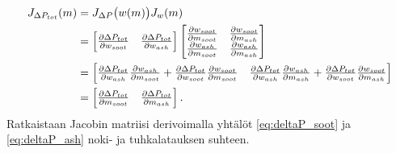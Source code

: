 \begin{align}\label{eq:jacob_total_general}
    \begin{split}
        J_{\Delta P_{tot}}(m)&=
        J_{\Delta P}\big(w(m)\big)  J_{w}(m)
\\ &=
    \begin{bmatrix}   
        \frac{\partial \Delta P_{tot}}{\partial w_{soot}}
        &   
        \frac{\partial \Delta P_{tot}}{\partial w_{ash}}
         \end{bmatrix}
    \begin{bmatrix} 
        \frac{\partial w_{soot}}{\partial m_{soot}}
        & 
        \frac{\partial w_{soot}}{\partial m_{ash}} 
        \\ 
        \frac{\partial w_{ash}}{\partial m_{soot}}
        & 
        \frac{\partial w_{ash}}{\partial m_{ash}} 
         \end{bmatrix}
\\ &=
    \begin{bmatrix} 
        \frac{\partial \Delta P_{tot}}{\partial w_{ash}}
        \frac{\partial w_{ash}}{\partial m_{soot}}
        +
        \frac{\partial \Delta P_{tot}}{\partial w_{soot}}
        \frac{\partial w_{soot}}{\partial m_{soot}}
        &
        \frac{\partial \Delta P_{tot}}{\partial w_{ash}}
        \frac{\partial w_{ash}}{\partial m_{ash}}
        +
        \frac{\partial \Delta P_{tot}}{\partial w_{soot}}
        \frac{\partial w_{soot}}{\partial m_{ash}}
         \end{bmatrix} 
\\ &= 
    \begin{bmatrix} 
        \frac{\partial \Delta P_{tot}}{\partial m_{soot}}
        & 
        \frac{\partial \Delta P_{tot}}{\partial m_{ash}} 
         \end{bmatrix}.
    \end{split}
\end{align}
Ratkaistaan Jacobin matriisi 
derivoimalla yhtälöt 
\eqref{eq:deltaP_soot} ja \eqref{eq:deltaP_ash}
noki- ja tuhkalatauksen suhteen. 

